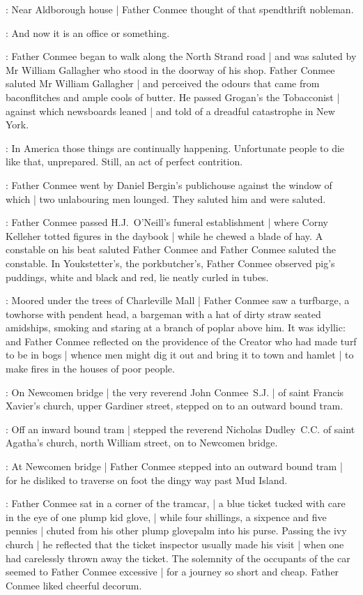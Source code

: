 :
Near Aldborough house |
Father Conmee thought of that spendthrift nobleman.

\conmeeint:
And now it is an office or something.

:
Father Conmee began to walk along the North Strand road |
and was saluted by Mr William Gallagher
who stood in the doorway of his shop.
Father Conmee saluted Mr William Gallagher |
and perceived the odours
that came from baconflitches and ample cools of butter.
He passed Grogan's the Tobacconist |
against which newsboards leaned |
and told of a dreadful catastrophe
in New York.

\conmeeint:
In America those things are continually happening.
Unfortunate people to die like that, unprepared.
Still, an act of perfect contrition.

:
Father Conmee went by Daniel Bergin's publichouse
against the window of which |
two unlabouring men lounged.
They saluted him and were saluted.

:
Father Conmee passed H.J.~O'Neill's funeral establishment |
where Corny Kelleher totted figures in the daybook |
while he chewed a blade of hay.
A constable on his beat saluted Father Conmee
and Father Conmee saluted the constable.
In Youkstetter's, the porkbutcher's,
Father Conmee observed pig's puddings,
white and black and red,
lie neatly curled in tubes.

:
Moored under the trees of Charleville Mall |
Father Conmee saw a turfbarge,
a towhorse with pendent head,
a bargeman with a hat of dirty straw seated amidships,
smoking and staring at a branch of poplar above him.
It was idyllic:
and Father Conmee reflected on the providence of the Creator
who had made turf to be in bogs |
whence men might dig it out and bring it to town and hamlet |
to make fires in the houses of poor people.

:
On Newcomen bridge |
the very reverend John Conmee~S.J. |
of saint Francis Xavier's church, upper Gardiner street,
stepped on to an outward bound tram.

:
Off an inward bound tram |
stepped the reverend Nicholas Dudley~C.C.
of saint Agatha's church, north William street,
on to Newcomen bridge.

:
At Newcomen bridge |
Father Conmee stepped into an outward bound tram |
for he disliked to traverse on foot the dingy way past Mud Island.

:
Father Conmee sat in a corner of the tramcar, |
a blue ticket tucked with care in the eye of one plump kid glove, |
while four shillings, a sixpence and five pennies |
chuted from his other plump glovepalm into his purse.
Passing the ivy church |
he reflected that the ticket inspector usually made his visit |
when one had carelessly thrown away the ticket.
The solemnity of the occupants of the car
seemed to Father Conmee excessive |
for a journey so short and cheap.
Father Conmee liked cheerful decorum.


